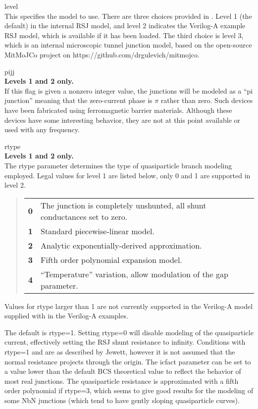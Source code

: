 \begin{description}
\item{\vt level}\\
This specifies the model to use.  There are three choices provided in
{\WRspice}.  Level 1 (the default) in the internal RSJ model, and
level 2 indicates the Verilog-A example RSJ model, which is available
if it has been loaded.  The third choice is level 3, which is an
internal microscopic tunnel junction model, based on the open-source
MitMoJCo project on {\vt https://github.com/drgulevich/mitmojco}. 

\item{\vt pijj}\\
{\bf Levels 1 and 2 only.}\\
If this flag is given a nonzero integer value, the junctions will be
modeled as a ``pi junction'' meaning that the zero-current phase is
$\pi$ rather than zero.  Such devices have been fabricated using
ferromagnetic barrier materials.  Although these devices have some
interesting behavior, they are not at this point available or used
with any frequency.

\item{\vt rtype}\\
{\bf Levels 1 and 2 only.}\\
The {\vt rtype} parameter determines the type of quasiparticle branch
modeling employed.  Legal values for level 1 are listed below, only 0
and 1 are supported in level 2.
\begin{quote}
\begin{tabular}{ll}
\bf 0 & The junction is completely unshunted, all shunt conductances
 set to zero.\\
\bf 1 & Standard piecewise-linear model.\\
\bf 2 & Analytic exponentially-derived approximation.\\
\bf 3 & Fifth order polynomial expansion model.\\
\bf 4 & ``Temperature'' variation, allow modulation of the gap parameter.\\
\end{tabular}
\end{quote}

Values for {\vt rtype} larger than 1 are not currently supported in
the Verilog-A model supplied with {\WRspice} in the Verilog-A
examples.

The default is {\vt rtype=1}.  Setting {\vt rtype=0} will disable
modeling of the quasiparticle current, effectively setting the RSJ
shunt resistance to infinity.  Conditions with {\vt rtype=1} and {} are as described by Jewett, however it is not assumed that the
normal resistance projects through the origin.  The {\vt icfact}
parameter can be set to a value lower than the default BCS theoretical
value to reflect the behavior of most real junctions.  The
quasiparticle resistance is approximated with a fifth order polynomial
if {\vt rtype=3}, which seems to give good results for the modeling of
some NbN junctions (which tend to have gently sloping quasiparticle
curves).


\end{description}

